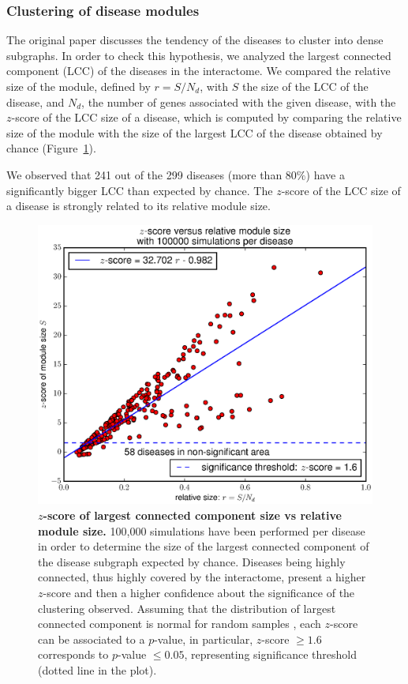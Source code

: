 \documentclass[letterpaper]{article}
\begin{document}
		\subsubsection{Clustering of disease modules}
		The original paper discusses the tendency of the diseases to cluster into dense subgraphs. In order
		to check this hypothesis, we analyzed the largest connected component (LCC) of the diseases in the
		interactome. We compared the relative size of the module, defined by $r = S/N_d$, with $S$ the size
		of the LCC of the disease, and $N_d$, the number of genes associated with the given disease, with
		the $z$-score of the LCC size of a disease, which is computed by comparing the relative size of the
		module with the size of the largest LCC of the disease obtained by chance (Figure~\ref{fig:zscore}).

		We observed that 241 out of the 299 diseases (more than $80\%$) have a significantly bigger LCC than
		expected by chance. The $z$-score of the LCC size of a disease is strongly related to its relative
		module size.

		\begin{figure}[!h]
			\includegraphics[width=.5\textwidth]{images/S4.b100000.eps}
			\vspace{-.7cm}
			\caption{\textbf {$z$-score of largest connected component size vs relative module size.}
			100,000 simulations have been performed per disease in order to determine the size of the largest
			connected component of the disease subgraph expected by chance. Diseases being highly connected,
			thus highly covered by the interactome, present a higher $z$-score and then a higher confidence
			about the significance of the clustering observed. Assuming that the distribution of largest
			connected component is normal for random samples \citep{fluctuationGiantComponent}, each $z$-score
			can be associated to a $p$-value, in particular, $z$-score $\geq 1.6$ corresponds to $p$-value
			$\leq 0.05$, representing significance threshold (dotted line in the plot).
			\label{fig:zscore}}
		\end{figure}
\end{document}
